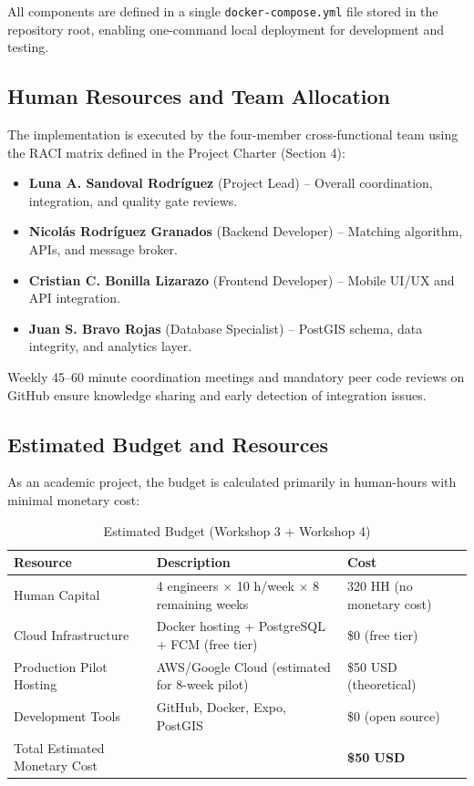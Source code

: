 \documentclass[9pt,conference]{IEEEtran}
\begin{document}
All components are defined in a single \texttt{docker-compose.yml} file stored in the repository root, enabling one-command local deployment for development and testing.

\subsection{Human Resources and Team Allocation}

The implementation is executed by the four-member cross-functional team using the RACI matrix defined in the Project Charter (Section 4):

\begin{itemize}
    \item \textbf{Luna A. Sandoval Rodríguez} (Project Lead) – Overall coordination, integration, and quality gate reviews.
    \item \textbf{Nicolás Rodríguez Granados} (Backend Developer) – Matching algorithm, APIs, and message broker.
    \item \textbf{Cristian C. Bonilla Lizarazo} (Frontend Developer) – Mobile UI/UX and API integration.
    \item \textbf{Juan S. Bravo Rojas} (Database Specialist) – PostGIS schema, data integrity, and analytics layer.
\end{itemize}

Weekly 45–60 minute coordination meetings and mandatory peer code reviews on GitHub ensure knowledge sharing and early detection of integration issues.

\subsection{Estimated Budget and Resources}

As an academic project, the budget is calculated primarily in human-hours with minimal monetary cost:

\begin{table}[h]
\centering
\small
\caption{Estimated Budget (Workshop 3 + Workshop 4)}
\label{tab:budget}
\begin{tabular}{@{}p{2.5cm}p{3.0cm}p{2.5cm}@{}}
\toprule
\textbf{Resource} & \textbf{Description} & \textbf{Cost} \\
\midrule
Human Capital & 4 engineers $\times$ 10 h/week $\times$ 8 remaining weeks & 320 HH (no monetary cost) \\
Cloud Infrastructure & Docker hosting + PostgreSQL + FCM (free tier) & \$0 (free tier) \\
Production Pilot Hosting & AWS/Google Cloud (estimated for 8-week pilot) & \$50 USD (theoretical) \\
Development Tools & GitHub, Docker, Expo, PostGIS & \$0 (open source) \\
Total Estimated Monetary Cost & & \textbf{\$50 USD} \\
\bottomrule
\end{tabular}
\end{table}
\end{document}
